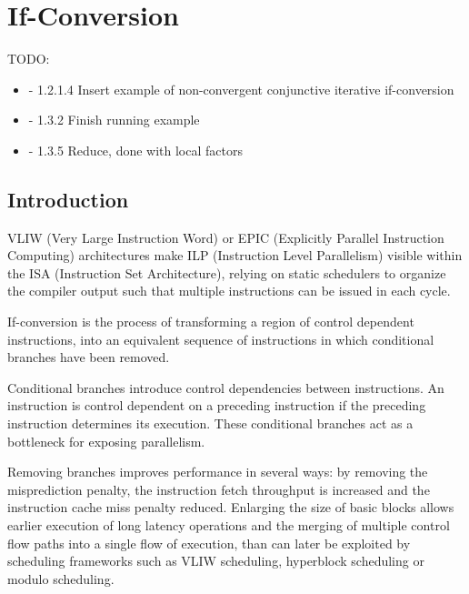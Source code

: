 \chapter{If-Conversion }\label{chap:if_conversion}
\label{chap:if_conv}
\graphicspath{{img/}{if_conversion/img/}{part4/if_conversion/img/}}

\newcommand\cond{~?~}
\newcommand{\annotation}[1]{%
  \marginpar{\small\itshape\color{red}#1}}


TODO:
\begin{itemize}
\item  - 1.2.1.4 Insert example of non-convergent conjunctive iterative if-conversion
\item  - 1.3.2   Finish running example 
\item  - 1.3.5   Reduce, done with local factors
 \end{itemize}

\section{Introduction}

VLIW (Very Large Instruction Word) or EPIC (Explicitly Parallel Instruction Computing) architectures make ILP (Instruction Level Parallelism) visible within the ISA (Instruction Set Architecture), relying on static schedulers to organize the compiler output such that multiple instructions can be issued in each cycle.

If-conversion is the process of transforming a region of control dependent instructions, into an equivalent sequence of instructions in which conditional branches have been removed.

Conditional branches introduce control dependencies between instructions. An instruction is control dependent on a preceding instruction if the preceding instruction determines its execution. These conditional branches act as a bottleneck for exposing parallelism.

Removing branches improves performance in several ways: by removing the misprediction penalty, the instruction fetch throughput is increased and the instruction cache miss penalty reduced. Enlarging the size of basic blocks allows earlier execution of long latency operations and the merging of multiple control flow paths into a single flow of execution, than can later be exploited by scheduling frameworks such as VLIW scheduling, hyperblock scheduling or modulo scheduling.

